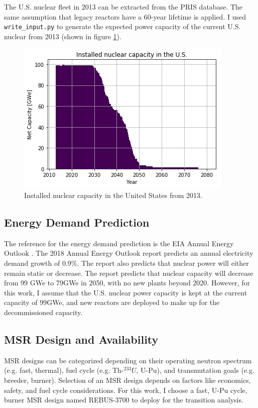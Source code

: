 The U.S. nuclear fleet in 2013 can be extracted from the \gls{PRIS} database.
The same assumption that legacy reactors have a 60-year lifetime is applied.
I used \texttt{write\_input.py} to generate the expected power capacity
of the current U.S. nuclear from 2013 (shown in figure \ref{fig:us_legacy}).

\begin{figure}[htbp!]
	\begin{center}
		\includegraphics[scale=0.7]{./images/us/legacy_power.png}
	\end{center}
	\caption{Installed nuclear capacity in the United States from 2013.}
	\label{fig:us_legacy}
\end{figure}


\subsection{Energy Demand Prediction}
The reference for the energy demand prediction is the 
\gls{EIA} Annual Energy Outlook \cite{u.s._eia_annual_2018}.
The 2018 Annual Energy Outlook report predicts an annual electricity demand growth
of 0.9\%. The report also predicts that nuclear
power will either remain static or decrease. The report
predicts that nuclear capacity will decrease from 99 GWe
to 79GWe in 2050, with no new plants beyond 2020.
However, for this work,
I assume that the U.S. nuclear power capacity is kept at the
current capacity of 99GWe, and new reactors are deployed to make up for the
decommissioned capacity.

\subsection{\gls{MSR} Design and Availability}

\gls{MSR} designs can be categorized depending on their operating
neutron spectrum (e.g. fast, thermal), fuel cycle (e.g. Th-$^{233}U$, U-Pu),
and transmutation goals (e.g. breeder, burner). Selection of an \gls{MSR}
design depends on factors like economics, safety, and fuel cycle
considerations. For this work, I choose a fast, U-Pu cycle, burner \gls{MSR} design
named REBUS-3700 \cite{mourogov_potentialities_2006} to deploy for the
transition analysis.

